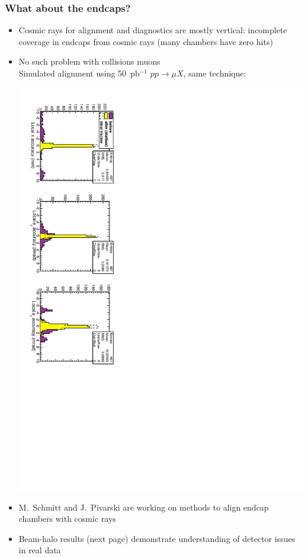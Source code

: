 \documentclass[compress]{beamer}
\begin{document}
\begin{frame}
\frametitle{What about the endcaps?}

\begin{itemize}
\item Cosmic rays for alignment and diagnostics are mostly vertical:
  incomplete coverage in endcaps from cosmic rays (many chambers have zero hits)
\item No such problem with collisions muons \\ Simulated alignment using 50~pb$^{-1}$ $pp \to \mu X$, same technique:

\begin{center} \includegraphics[height=\linewidth, angle=90]{alignment_50pb-1_csconly.pdf} \end{center}

\item M.~Schmitt and J.~Pivarski are working on methods to align endcap chambers with cosmic rays
\item Beam-halo results (next page) demonstrate understanding of detector issues in real data
\end{itemize}
\end{frame}
\end{document}
